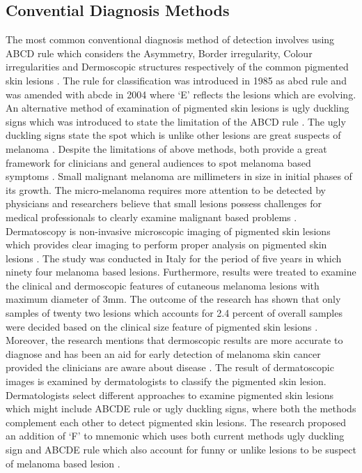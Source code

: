 \subsection{Convential Diagnosis Methods}

The most common conventional diagnosis method of detection involves
using ABCD rule which considers the Asymmetry, Border irregularity,
Colour irregularities and  Dermoscopic structures respectively of the
common pigmented skin lesions \citep{LOESCHER2013170}. 
The rule for classification was introduced in 1985 as abcd 
rule and was amended with abcde in 2004 where ‘E’ reflects the 
lesions which are evolving. An alternative method of examination of
pigmented skin lesions is  ugly duckling signs which was introduced 
to state the limitation of the ABCD rule \citep{DanielJensen2015}.
The ugly duckling signs state the spot which is unlike other 
lesions are great suspects of melanoma \citep{grob1998ugly}.
Despite the limitations of above methods, both provide a great
framework for clinicians and general audiences to spot melanoma 
based symptoms \citep{DanielJensen2015}.
Small malignant melanoma are millimeters in size in initial phases
of its growth.  
The micro-melanoma requires more attention to be
detected by physicians and researchers believe that small 
lesions possess challenges for medical professionals to 
clearly examine malignant based problems \citep{doi:10.1177/030089160409000125}.
Dermatoscopy is non-invasive microscopic imaging of pigmented skin 
lesions which provides clear imaging to perform proper analysis on 
pigmented skin lesions \citep{LOESCHER2013170}. 
The study was conducted in Italy for the period of five years in 
which ninety four melanoma based lesions. Furthermore, results 
were treated to examine the clinical and dermoscopic features of 
cutaneous melanoma lesions with maximum diameter of 3mm. 
The outcome of the research has shown that only samples of twenty two lesions which 
accounts for 2.4 percent of overall samples were decided based on
the clinical size feature of pigmented skin lesions \citep{doi:10.1177/030089160409000125}.
Moreover, the research mentions that dermoscopic results are more accurate to diagnose 
and has been an aid for early detection of melanoma skin cancer 
provided the clinicians are aware about disease \citep{doi:10.1177/030089160409000125}.
The result of dermatoscopic images is examined by dermatologists to classify the pigmented skin lesion.
Dermatologists select different approaches to examine pigmented
skin lesions which might include ABCDE rule or ugly duckling signs, 
where both the methods complement each other to detect pigmented skin lesions. 
The research proposed an addition of ‘F’ to mnemonic which uses both 
current methods ugly duckling sign and ABCDE rule which also account 
for funny or unlike lesions to be suspect of melanoma based lesion \citep{doi:10.1177/030089160409000125}.

